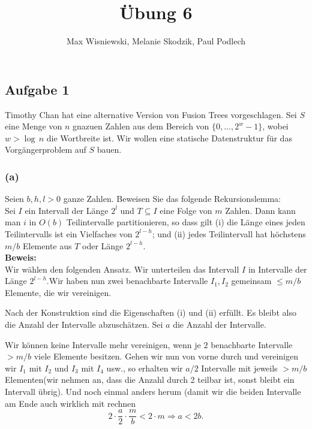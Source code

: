 \documentclass[11pt,a4paper,ngerman]{article}
\date{}
\title{Übung 6}
\author{Max Wisniewski, Melanie Skodzik, Paul Podlech}
\begin{document}

\renewcommand{\figurename}{Grafik}

\maketitle
\thispagestyle{fancy}


\subsection*{Aufgabe 1}

Timothy Chan hat eine alternative Version von Fusion Trees vorgeschlagen. Sei $S$ eine Menge von $n$ gnazuen Zahlen aus dem Bereich von $\{0, \ldots, 2^w - 1\}$, wobei $w > \log \, n$ die Wortbreite ist. Wir wollen eine statische Datenstruktur für das Vorgängerproblem auf $S$ bauen.

\subsubsection*{(a)}

Seien $b,h,l > 0$ ganze Zahlen. Beweisen Sie das folgende Rekursionslemma:\\
\noindent Sei $I$ ein Intervall der Länge $2^l$ und $T \subseteq I$ eine Folge von $m$ Zahlen. Dann kann man $i$ in $O(b)$ Teilintervalle partitionieren, so dass gilt (i) die Länge eines jeden Teilintervalls ist ein Vielfaches von $2^{l-h}$; und (ii) jedes Teilintervall hat höchstens $m/b$ Elemente aus $T$ oder Länge $2^{l-h}$.\\

\noindent\textbf{Beweis:}\\

Wir wählen den folgenden Ansatz. Wir unterteilen das Intervall $I$ in Intervalle der Länge $2^{l-h}$.Wir haben nun zwei benachbarte Intervalle $I_1, I_2$ gemeinsam $\leq m/b$ Elemente, die wir vereinigen.

Nach der Konstruktion sind die Eigenschaften (i) und (ii) erfüllt. Es bleibt also die Anzahl der
Intervalle abzuschätzen. Sei $a$ die Anzahl der Intervalle.

Wir können keine Intervalle mehr vereinigen, wenn je $2$ benachbarte Intervalle $> m/b$ viele Elemente besitzen. Gehen wir nun von vorne durch und vereinigen wir $I_1$ mit $I_2$ und $I_3$ mit $I_4$ usw., so erhalten wir $a/2$ Intervalle mit jeweils $>m/b$ Elementen(wir nehmen an, dass die Anzahl durch 2 teilbar ist, sonst bleibt ein Intervall übrig). Und noch einmal anders herum (damit wir die beiden Intervalle am Ende auch wirklich mit rechnen
$$
   2\cdot\frac{a}{2} \cdot \frac{m}{b} < 2\cdot m \Rightarrow a < 2b.
$$
\end{document}
